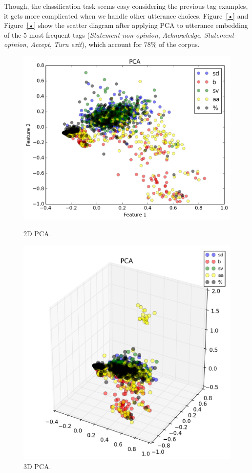 Though, the classification task seems easy considering the previous tag examples, it gets more complicated when we handle other utterance choices. Figure~\ref{•} and Figure~\ref{•} show the scatter diagram after applying PCA to utterance embedding of the 5 most frequent tags (\emph{Statement-non-opinion}, \emph{Acknowledge}, \emph{Statement-opinion}, \emph{Accept}, \emph{Turn exit}), which account for $78\%$ of the corpus.

\begin{figure}
\centering
\begin{minipage}{.23\textwidth}
\includegraphics[width=1\textwidth]{img/complex_pca_2d}
\caption{2D PCA.}
\label{fig:2d_pca}
\end{minipage}
\begin{minipage}{.23\textwidth}
\includegraphics[width=1\textwidth]{img/complex_pca_3d}
\caption{3D PCA.}
\label{fig:3d_pca}
\end{minipage}
\end{figure}
